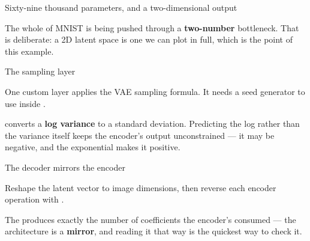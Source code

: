 \documentclass[aspectratio=169,11pt,t]{beamer}
\begin{document}
\begin{frame}[shrink=25]{Sixty-nine thousand parameters, and a two-dimensional output}
{\fontsize{9.4}{12.6}\selectfont\color{fg2}The whole of MNIST is being pushed through a \textbf{two-number} bottleneck. That is deliberate: a 2D latent space is one we can plot in full, which is the point of this example.\par}\vskip 4pt
\end{frame}

\begin{frame}[shrink=25]{The sampling layer}
{\fontsize{9.4}{12.6}\selectfont\color{fg2}One custom layer applies the VAE sampling formula. It needs a seed generator to use  inside .\par}\vskip 4pt
{\fontsize{9.4}{12.6}\selectfont\color{fg2} converts a \textbf{log variance} to a standard deviation. Predicting the log rather than the variance itself keeps the encoder's output unconstrained --- it may be negative, and the exponential makes it positive.\par}\vskip 4pt
\end{frame}

\begin{frame}[shrink=25]{The decoder mirrors the encoder}
{\fontsize{9.4}{12.6}\selectfont\color{fg2}Reshape the latent vector to image dimensions, then reverse each encoder operation with .\par}\vskip 4pt
{\fontsize{9.4}{12.6}\selectfont\color{fg2}The  produces exactly the number of coefficients the encoder's  consumed --- the architecture is a \textbf{mirror}, and reading it that way is the quickest way to check it.\par}\vskip 4pt
\end{frame}
\end{document}
